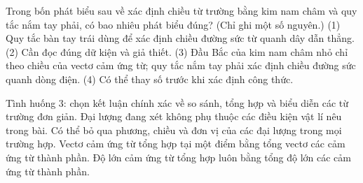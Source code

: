 \begin{ex}
Trong bốn phát biểu sau về xác định chiều từ trường bằng kim nam châm và quy tắc nắm tay phải, có bao nhiêu phát biểu đúng? (Chỉ ghi một số nguyên.) (1) Quy tắc bàn tay trái dùng để xác định chiều đường sức từ quanh dây dẫn thẳng. (2) Cần đọc đúng dữ kiện và giả thiết. (3) Đầu Bắc của kim nam châm nhỏ chỉ theo chiều của vectơ cảm ứng từ; quy tắc nắm tay phải xác định chiều đường sức quanh dòng điện. (4) Có thể thay số trước khi xác định công thức.
\end{ex}

\begin{ex}
Tình huống 3: chọn kết luận chính xác về so sánh, tổng hợp và biểu diễn các từ trường đơn giản.
\choice
{Đại lượng đang xét không phụ thuộc các điều kiện vật lí nêu trong bài.}
{Có thể bỏ qua phương, chiều và đơn vị của các đại lượng trong mọi trường hợp.}
{\True Vectơ cảm ứng từ tổng hợp tại một điểm bằng tổng vectơ các cảm ứng từ thành phần.}
{Độ lớn cảm ứng từ tổng hợp luôn bằng tổng độ lớn các cảm ứng từ thành phần.}
\end{ex}

